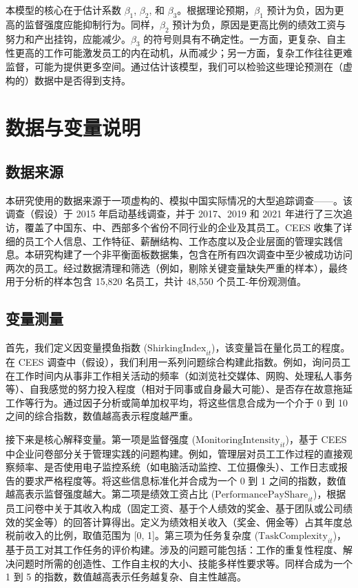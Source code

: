 本模型的核心在于估计系数 \(\beta_1\), \(\beta_2\), 和 \(\beta_3\)。根据理论预期，\(\beta_1\) 预计为负，因为更高的监督强度应能抑制行为。同样，\(\beta_2\) 预计为负，原因是更高比例的绩效工资与努力和产出挂钩，应能减少。\(\beta_3\) 的符号则具有不确定性。一方面，更复杂、自主性更高的工作可能激发员工的内在动机，从而减少；另一方面，复杂工作往往更难监督，可能为提供更多空间。通过估计该模型，我们可以检验这些理论预测在（虚构的）数据中是否得到支持。

\section{数据与变量说明}

\subsection{数据来源}

本研究使用的数据来源于一项虚构的、模拟中国实际情况的大型追踪调查——。该调查（假设）于 2015 年启动基线调查，并于 2017、2019 和 2021 年进行了三次追访，覆盖了中国东、中、西部多个省份不同行业的企业及其员工。CEES 收集了详细的员工个人信息、工作特征、薪酬结构、工作态度以及企业层面的管理实践信息。本研究构建了一个非平衡面板数据集，包含在所有四次调查中至少被成功访问两次的员工。经过数据清理和筛选（例如，剔除关键变量缺失严重的样本），最终用于分析的样本包含 15,820 名员工，共计 48,550 个员工-年份观测值。

\subsection{变量测量}

首先，我们定义因变量{摸鱼指数 (\(\text{ShirkingIndex}_{it}\))}，该变量旨在量化员工的程度。在 CEES 调查中（假设），我们利用一系列问题综合构建此指数。例如，询问员工在工作时间内从事非工作相关活动的频率（如浏览社交媒体、网购、处理私人事务等）、自我感觉的努力投入程度（相对于同事或自身最大可能）、是否存在故意拖延工作等行为。通过因子分析或简单加权平均，将这些信息合成为一个介于 0 到 10 之间的综合指数，数值越高表示程度越严重。

接下来是核心解释变量。第一项是{监督强度 (\(\text{MonitoringIntensity}_{it}\))}，基于 CEES 中企业问卷部分关于管理实践的问题构建。例如，管理层对员工工作过程的直接观察频率、是否使用电子监控系统（如电脑活动监控、工位摄像头）、工作日志或报告的要求严格程度等。将这些信息标准化并合成为一个 0 到 1 之间的指数，数值越高表示监督强度越大。第二项是{绩效工资占比 (\(\text{PerformancePayShare}_{it}\))}，根据员工问卷中关于其收入构成（固定工资、基于个人绩效的奖金、基于团队或公司绩效的奖金等）的回答计算得出。定义为绩效相关收入（奖金、佣金等）占其年度总税前收入的比例，取值范围为 [0, 1]。第三项为{任务复杂度 (\(\text{TaskComplexity}_{it}\))}，基于员工对其工作任务的评价构建。涉及的问题可能包括：工作的重复性程度、解决问题时所需的创造性、工作自主权的大小、技能多样性要求等。同样合成为一个 1 到 5 的指数，数值越高表示任务越复杂、自主性越高。

